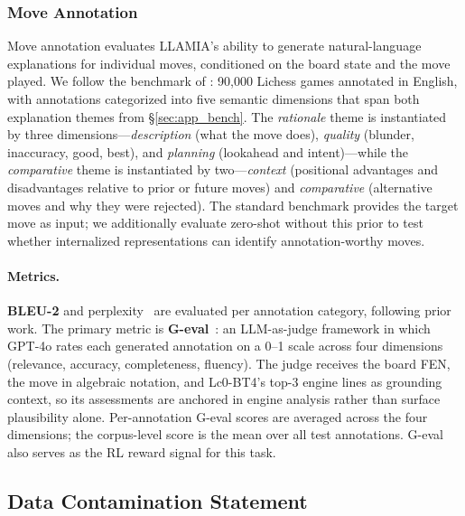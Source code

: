 \subsubsection{Move Annotation}
\label{sec:app_bench_annotation}

Move annotation evaluates LLAMIA's ability to generate natural-language explanations for individual moves, conditioned on the board state and the move played. We follow the benchmark of \citet{jhamtani-etal-2018-learning}: 90,000 Lichess games annotated in English, with annotations categorized into five semantic dimensions that span both explanation themes from \S\ref{sec:app_bench}. The \emph{rationale} theme is instantiated by three dimensions---\emph{description} (what the move does), \emph{quality} (blunder, inaccuracy, good, best), and \emph{planning} (lookahead and intent)---while the \emph{comparative} theme is instantiated by two---\emph{context} (positional advantages and disadvantages relative to prior or future moves) and \emph{comparative} (alternative moves and why they were rejected). The standard benchmark provides the target move as input; we additionally evaluate zero-shot without this prior to test whether internalized representations can identify annotation-worthy moves.

\paragraph{Metrics.}
\textbf{BLEU-2} and perplexity~\citep{lee2022improving} are evaluated per annotation category, following prior work. The primary metric is \textbf{G-eval}~\citep{liu2023g}: an LLM-as-judge framework in which GPT-4o rates each generated annotation on a 0--1 scale across four dimensions (relevance, accuracy, completeness, fluency). The judge receives the board FEN, the move in algebraic notation, and Lc0-BT4's top-3 engine lines as grounding context, so its assessments are anchored in engine analysis rather than surface plausibility alone. Per-annotation G-eval scores are averaged across the four dimensions; the corpus-level score is the mean over all test annotations. G-eval also serves as the RL reward signal for this task.

\subsection{Data Contamination Statement}
\label{sec:app_bench_contamination}

